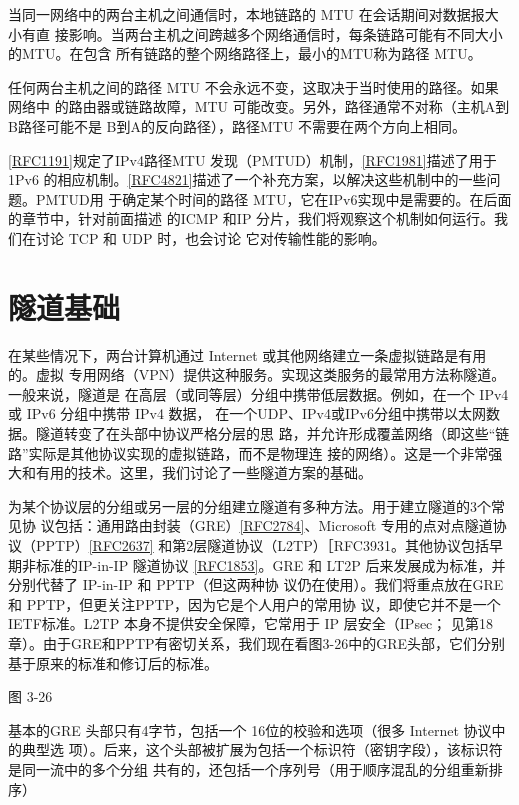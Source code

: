 当同一网络中的两台主机之间通信时，本地链路的 MTU 在会话期间对数据报大小有直
接影响。当两台主机之间跨越多个网络通信时，每条链路可能有不同大小的MTU。在包含
所有链路的整个网络路径上，最小的MTU称为路径 MTU。

任何两台主机之间的路径 MTU 不会永远不变，这取决于当时使用的路径。如果网络中
的路由器或链路故障，MTU 可能改变。另外，路径通常不对称（主机A到B路径可能不是
B到A的反向路径），路径MTU 不需要在两个方向上相同。

\href{https://www.rfc-editor.org/rfc/rfc1191}{[RFC1191]}规定了IPv4路径MTU
发现（PMTUD）机制，\href{https://www.rfc-editor.org/rfc/rfc1981}{[RFC1981]}描述了用于1Pv6
的相应机制。\href{https://www.rfc-editor.org/rfc/rfc4821}{[RFC4821]}描述了一个补充方案，以解决这些机制中的一些问题。PMTUD用
于确定某个时间的路径 MTU，它在IPv6实现中是需要的。在后面的章节中，针对前面描述
的ICMP 和IP 分片，我们将观察这个机制如何运行。我们在讨论 TCP 和 UDP 时，也会讨论
它对传输性能的影响。

\section{隧道基础}

在某些情况下，两台计算机通过 Internet 或其他网络建立一条虚拟链路是有用的。虚拟
专用网络（VPN）提供这种服务。实现这类服务的最常用方法称隧道。一般来说，隧道是
在高层（或同等层）分组中携带低层数据。例如，在一个 IPv4或 IPv6 分组中携带 IPv4 数据，
在一个UDP、IPv4或IPv6分组中携带以太网数据。隧道转变了在头部中协议严格分层的思
路，并允许形成覆盖网络（即这些“链路”实际是其他协议实现的虚拟链路，而不是物理连
接的网络）。这是一个非常强大和有用的技术。这里，我们讨论了一些隧道方案的基础。

为某个协议层的分组或另一层的分组建立隧道有多种方法。用于建立隧道的3个常见协
议包括：通用路由封装（GRE）\href{https://www.rfc-editor.org/rfc/rfc2784}{[RFC2784]}、Microsoft
专用的点对点隧道协议（PPTP）\href{https://www.rfc-editor.org/rfc/rfc2637}{[RFC2637]}
和第2层隧道协议（L2TP）［RFC3931。其他协议包括早期非标准的IP-in-IP 隧道协议
\href{https://www.rfc-editor.org/rfc/rfc1853}{[RFC1853]}。GRE 和 LT2P
后来发展成为标准，并分别代替了 IP-in-IP 和 PPTP（但这两种协
议仍在使用）。我们将重点放在GRE 和 PPTP，但更关注PPTP，因为它是个人用户的常用协
议，即使它并不是一个 IETF标准。L2TP 本身不提供安全保障，它常用于 IP 层安全（IPsec；
见第18章）。由于GRE和PPTP有密切关系，我们现在看图3-26中的GRE头部，它们分别
基于原来的标准和修订后的标准。

图 3-26

基本的GRE 头部只有4字节，包括一个 16位的校验和选项（很多 Internet 协议中的典型选
项）。后来，这个头部被扩展为包括一个标识符（密钥字段），该标识符是同一流中的多个分组
共有的，还包括一个序列号（用于顺序混乱的分组重新排序）

